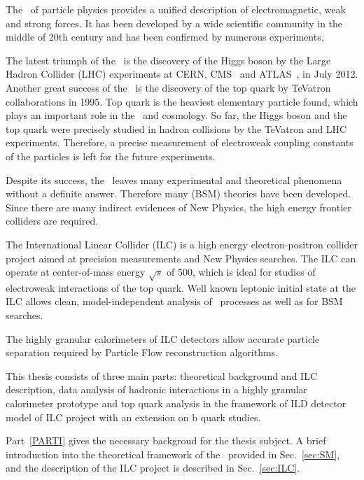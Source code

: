 
The \sm\ of particle physics provides a unified description of electromagnetic, weak and strong forces. It has been developed by a wide scientific community in the middle of 20th century and has been confirmed by numerous experiments. 

The latest triumph of the \sm\ is the discovery of the Higgs boson by the Large Hadron Collider (LHC) experiments at CERN, CMS~\cite{bib:HiggsCms} and ATLAS~\cite{bib:HiggsAtlas}, in July 2012.
Another great success of the \sm\ is the discovery of the top quark by TeVatron collaborations in 1995. Top quark is the heaviest elementary particle found, which plays an important role in the \sm\ and cosmology. 
So far, the Higgs boson and the top quark were precisely studied in hadron collisions by the TeVatron and LHC experiments. Therefore, a precise measurement of electroweak coupling constants of the particles is left for the future experiments.

Despite its success, the \sm\ leaves many experimental and theoretical phenomena without a definite answer. Therefore many \bsm (BSM) theories have been developed. 
Since there are many indirect evidences of New Physics, the high energy frontier colliders are required. 

The International Linear Collider \cite{bib:ILC} (ILC) is a high energy electron-positron collider project aimed at precision measurements and New Physics searches. 
The ILC can operate at center-of-mass energy $\sqrt{s}$ of 500\gev, which is ideal for studies of electroweak interactions of the top quark. 
Well known leptonic initial state at the ILC allows clean, model-independent analysis of \sm\ processes as well as for BSM searches. 

The highly granular calorimeters of ILC detectors allow accurate particle separation required by Particle Flow reconstruction algorithms.

This thesis consists of three main parts: theoretical background and ILC description, data analysis of hadronic interactions in a highly granular calorimeter prototype and top quark analysis in the framework of ILD detector model of ILC project with an extension on b quark studies.

Part~\ref{PARTI} gives the necessary backgroud for the thesis subject. A brief introduction into the theoretical framework of the \sm\ provided in Sec.~\ref{sec:SM}, and the description of the ILC project is described in Sec.~\ref{sec:ILC}.


